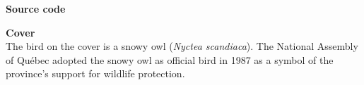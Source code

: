 \begin{frame}[t,plain,fragile=singleslide]
\begin{adjustwidth}{15mm}{15mm}
    \textbf{Source code} \\
    \vspace{2mm}

    \textbf{Cover} \\
    The bird on the cover is a snowy owl (\emph{Nyctea scandiaca}).
    The National Assembly of Québec adopted the snowy owl as official
    bird in 1987 as a symbol of the province’s support for wildlife
    protection.
  \end{adjustwidth}
\end{frame}


